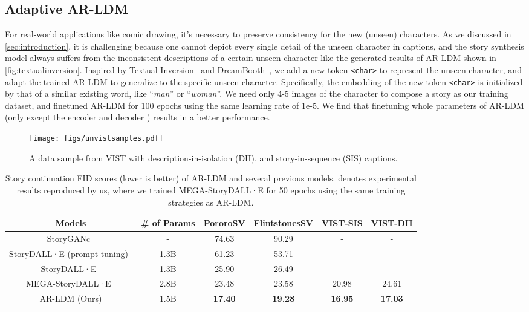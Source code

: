 \documentclass[10pt,twocolumn,letterpaper]{article}
\begin{document}
\subsection{Adaptive AR-LDM}
\label{sec:unseen_character_adaptation}
For real-world applications like comic drawing, it's necessary to preserve consistency for the new (unseen) characters. As we discussed in \cref{sec:introduction}, it is challenging because one cannot depict every single detail of the unseen character in captions, and the story synthesis model always suffers from the inconsistent descriptions of a certain unseen character like the generated results of AR-LDM shown in \cref{fig:textualinversion}. Inspired by Textual Inversion~\cite{textualinversion} and DreamBooth~\cite{dreambooth}, we add a new token \texttt{<char>} to represent the unseen character, and adapt the trained AR-LDM to generalize to the specific unseen character. Specifically, the embedding of the new token \texttt{<char>} is initialized by that of a similar existing word, like ``\textit{man}'' or ``\textit{woman}''. We need only 4-5 images of the character to compose a story as our training dataset, and finetuned AR-LDM for 100 epochs using the same learning rate of 1e-5. We find that finetuning whole parameters of AR-LDM (only except the encoder  and decoder ) results in a better performance.


\begin{figure}[!t]
    \centering
    \texttt{[image: figs/unvistsamples.pdf]}
    \caption{A data sample from VIST with description-in-isolation (DII), and story-in-sequence (SIS) captions.}
    \label{fig:vistsamples}
\end{figure}

\begin{table*}[t]
\small
\centering
\setlength\tabcolsep{12pt}
\begin{tabularx}{\linewidth}{cccccc}
    \toprule
    Models & \# of Params & PororoSV & FlintstonesSV & VIST-SIS & VIST-DII \\
    \midrule
    StoryGANc~\cite{storydalle} & - & 74.63 & 90.29 & - & - \\
    StoryDALL·E (prompt tuning)~\cite{storydalle} & 1.3B & 61.23 & 53.71 & - & - \\
    StoryDALL·E~\cite{storydalle} & 1.3B & 25.90 & 26.49 & - & - \\
    MEGA-StoryDALL·E~\cite{storydalle} & 2.8B & 23.48 & 23.58 & 20.98 & 24.61 \\
    AR-LDM (Ours) & 1.5B & \textbf{17.40} & \textbf{19.28} & \textbf{16.95} & \textbf{17.03} \\
    \bottomrule
    \end{tabularx}
\caption{Story continuation FID scores (lower is better) of AR-LDM and several previous models.  denotes experimental results reproduced by us, where we trained MEGA-StoryDALL·E for 50 epochs using the same training strategies as AR-LDM.}
\label{tb:continuationfid}
\vspace{-8pt}
\end{table*}
\end{document}
